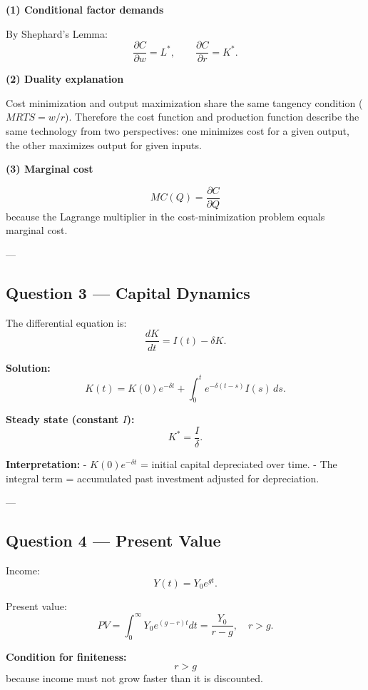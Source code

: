 \documentclass[12pt]{article}
\begin{document}
\textbf{(1) Conditional factor demands}

By Shephard’s Lemma:
\[
\boxed{
\frac{\partial C}{\partial w} = L^*, \qquad
\frac{\partial C}{\partial r} = K^*.
}
\]

\textbf{(2) Duality explanation}

Cost minimization and output maximization share the same tangency condition ($MRTS = w/r$). Therefore the cost function and production function describe the same technology from two perspectives: one minimizes cost for a given output, the other maximizes output for given inputs.

\textbf{(3) Marginal cost}

\[
\boxed{
MC(Q) = \frac{\partial C}{\partial Q}
}
\]
because the Lagrange multiplier in the cost-minimization problem equals marginal cost.

---

\subsection*{Question 3 — Capital Dynamics}

The differential equation is:
\[
\frac{dK}{dt}=I(t)-\delta K.
\]

\textbf{Solution:}
\[
\boxed{
K(t)
=K(0)e^{-\delta t}+\int_0^t e^{-\delta (t-s)}I(s)\,ds.
}
\]

\textbf{Steady state (constant $I$):}
\[
\boxed{
K^*=\frac{I}{\delta}.
}
\]

\textbf{Interpretation:}
- $K(0)e^{-\delta t}$ = initial capital depreciated over time.  
- The integral term = accumulated past investment adjusted for depreciation.

---

\subsection*{Question 4 — Present Value}

Income:
\[
Y(t) = Y_0 e^{gt}.
\]

Present value:
\[
PV = \int_0^\infty Y_0 e^{(g-r)t} dt
= \frac{Y_0}{r-g},
\quad r>g.
\]

\textbf{Condition for finiteness:}  
\[
\boxed{r>g}
\]
because income must not grow faster than it is discounted.
\end{document}
